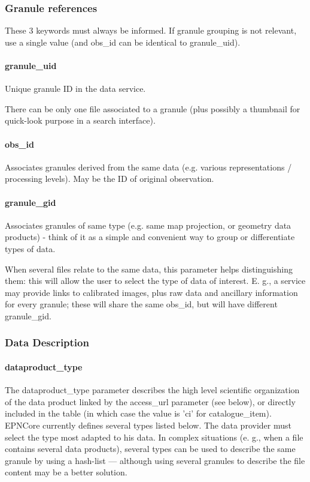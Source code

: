 \documentclass[11pt,a4paper]{ivoa}
\begin{document}
\subsubsection{Granule references}

These 3 keywords must always be informed. If granule grouping is not relevant, use a single value (and obs\_id can be identical to granule\_uid).

\paragraph{granule\_uid}

Unique granule ID in the data service.

There can be only one file associated to a granule (plus possibly a thumbnail for quick-look purpose in a search interface).

\paragraph{obs\_id}

Associates granules derived from the same data (e.g. various representations / processing levels). May be the ID of original observation.

\paragraph{granule\_gid}

Associates granules of same type (e.g. same map projection, or geometry data products) - think of it as a simple and convenient way to group or differentiate types of data.

When several files relate to the same data, this parameter helps distinguishing them: this will allow the user to select the type of data of interest. E. g., a service may provide links to calibrated images, plus raw data and ancillary information for every granule; these will share the same obs\_id, but will have different granule\_gid.

\subsubsection{Data Description}

\paragraph{dataproduct\_type}

The dataproduct\_type parameter describes the high level scientific organization of the data product linked by the access\_url parameter (see below), or directly included in the table (in which case the value is 'ci' for catalogue\_item). EPNCore currently defines several types listed below. The data provider must select the type most adapted to his data. In complex situations (e. g., when a file contains several data products), several types can be used to describe the same granule by using a hash-list — although using several granules to describe the file content may be a better solution.  
\end{document}

